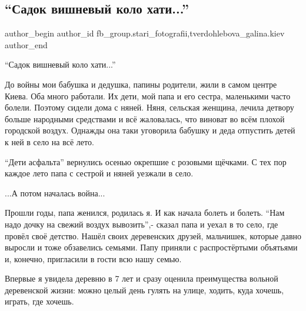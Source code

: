  
 
 
 
 
 
\subsection{\enquote{Садок вишневый коло хати...}}
\label{sec:28_11_2021.fb.fb_group.stari_fotografii.1.sadok_vyshnevyj}
 
\ifcmt
 author_begin
   author_id fb_group.stari_fotografii,tverdohlebova_galina.kiev
 author_end
\fi

\enquote{Садок вишневый коло хати...}

До войны мои бабушка и дедушка, папины родители, жили в самом центре Киева. Оба
много работали. Их дети, мой папа и его сестра, маленькими часто болели.
Поэтому сидели дома с няней. Няня, сельская женщина, лечила детвору больше
народными средствами и всё жаловалась, что виноват во всём плохой городской
воздух. Однажды она таки уговорила бабушку и деда отпустить детей к ней в село
на всё лето. 


\enquote{Дети асфальта} вернулись осенью окрепшие с розовыми щёчками. С тех пор каждое
лето папа с сестрой и няней уезжали в село.

...А потом началась война...

Прошли годы, папа женился, родилась я. И как начала болеть и болеть. \enquote{Нам надо
дочку на свежий воздух вывозить},- сказал папа и уехал в то село, где провёл
своё детство. Нашёл своих деревенских друзей, мальчишек, которые давно выросли
и тоже  обзавелись семьями. Папу приняли с распростёртыми объятьями и, конечно,
пригласили в гости всю нашу семью. 


Впервые я увидела деревню в 7 лет и сразу оценила преимущества вольной
деревенской жизни: можно целый день гулять на улице, ходить, куда хочешь,
играть, где хочешь. 

